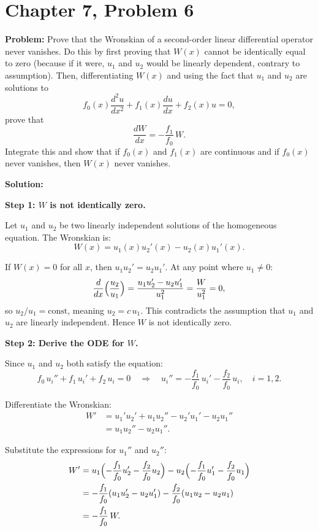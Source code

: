 \documentclass[12pt]{article}
\begin{document}
\section*{Chapter 7, Problem 6}

\textbf{Problem:} Prove that the Wronskian of a second-order linear differential operator never vanishes. Do this by first proving that $W(x)$ cannot be identically equal to zero (because if it were, $u_1$ and $u_2$ would be linearly dependent, contrary to assumption). Then, differentiating $W(x)$ and using the fact that $u_1$ and $u_2$ are solutions to
\[
f_0(x)\frac{d^2u}{dx^2} + f_1(x)\frac{du}{dx} + f_2(x)u = 0,
\]
prove that
\[
\frac{dW}{dx} = -\frac{f_1}{f_0}\,W.
\]
Integrate this and show that if $f_0(x)$ and $f_1(x)$ are continuous and if $f_0(x)$ never vanishes, then $W(x)$ never vanishes.

\bigskip
\textbf{Solution:}

\textbf{Step 1: $W$ is not identically zero.}

Let $u_1$ and $u_2$ be two linearly independent solutions of the homogeneous equation. The Wronskian is:
\[
W(x) = u_1(x)u_2'(x) - u_2(x)u_1'(x).
\]

If $W(x) = 0$ for all $x$, then $u_1 u_2' = u_2 u_1'$. At any point where $u_1 \neq 0$:
\[
\frac{d}{dx}\Bigl(\frac{u_2}{u_1}\Bigr) = \frac{u_1 u_2' - u_2 u_1'}{u_1^2} = \frac{W}{u_1^2} = 0,
\]
so $u_2/u_1 = \text{const}$, meaning $u_2 = c\,u_1$. This contradicts the assumption that $u_1$ and $u_2$ are linearly independent. Hence $W$ is not identically zero.

\textbf{Step 2: Derive the ODE for $W$.}

Since $u_1$ and $u_2$ both satisfy the equation:
\[
f_0\,u_i'' + f_1\,u_i' + f_2\,u_i = 0 \quad \Longrightarrow \quad u_i'' = -\frac{f_1}{f_0}\,u_i' - \frac{f_2}{f_0}\,u_i, \quad i = 1,2.
\]

Differentiate the Wronskian:
\begin{align}
W' &= u_1' u_2' + u_1 u_2'' - u_2' u_1' - u_2 u_1'' \\
&= u_1 u_2'' - u_2 u_1''.
\end{align}

Substitute the expressions for $u_1''$ and $u_2''$:
\begin{align}
W' &= u_1\Bigl(-\frac{f_1}{f_0}u_2' - \frac{f_2}{f_0}u_2\Bigr) - u_2\Bigl(-\frac{f_1}{f_0}u_1' - \frac{f_2}{f_0}u_1\Bigr) \\
&= -\frac{f_1}{f_0}(u_1 u_2' - u_2 u_1') - \frac{f_2}{f_0}(u_1 u_2 - u_2 u_1) \\
&= -\frac{f_1}{f_0}\,W.
\end{align}
\end{document}
